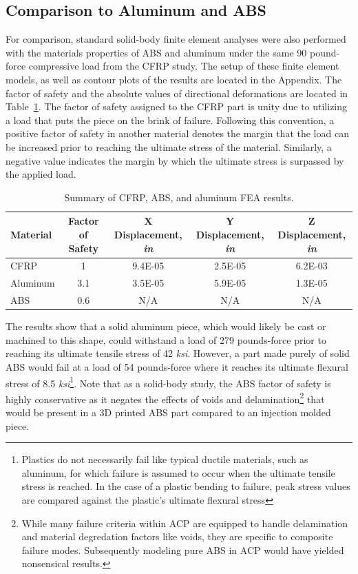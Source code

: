 \clearpage

\subsection{Comparison to Aluminum and ABS}

\indent

For comparison, standard solid-body finite element analyses were also performed with the materials properties of ABS and aluminum under the same 90 pound-force compressive load from the CFRP study. The setup of these finite element models, as well as contour plots of the results are located in the Appendix. The factor of safety and the absolute values of directional deformations are located in Table~\ref{tab:fea-cfrp-al-abs}. The factor of safety assigned to the CFRP part is unity due to utilizing a load that puts the piece on the brink of failure. Following this convention, a positive factor of safety in another material denotes the margin that the load can be increased prior to reaching the ultimate stress of the material. Similarly, a negative value indicates the margin by which the ultimate stress is surpassed by the applied load.

\begin{table}[htp]
    \centering
    \begin{tabular}{lcccc}
    
        Material & Factor of Safety & X Displacement, \emph{in} & Y Displacement, \emph{in} & Z Displacement, \emph{in} \\ \hline
        CFRP & 1 & 9.4E-05 & 2.5E-05 & 6.2E-03 \\
        Aluminum & 3.1 & 3.5E-05 & 5.9E-05 & 1.3E-05 \\
        ABS & 0.6 & N/A & N/A & N/A \\
                
    \end{tabular}
    \caption{Summary of CFRP, ABS, and aluminum FEA results.}
    \label{tab:fea-cfrp-al-abs}
\end{table}

The results show that a solid aluminum piece, which would likely be cast or machined to this shape, could withstand a load of 279 pounds-force prior to reaching its ultimate tensile stress of 42 \emph{ksi}. However, a part made purely of solid ABS would fail at a load of 54 pounds-force where it reaches its ultimate flexural stress of 8.5 \emph{ksi}\footnote{Plastics do not necessarily fail like typical ductile materials, such as aluminum, for which failure is assumed to occur when the ultimate tensile stress is reached. In the case of a plastic bending to failure, peak stress values are compared against the plastic's ultimate flexural stress}. Note that as a solid-body study, the ABS factor of safety is highly conservative as it negates the effects of voids and delamination\footnote{While many failure criteria within ACP are equipped to handle delamination and material degredation factors like voids, they are specific to composite failure modes. Subsequently modeling pure ABS in ACP would have yielded nonsensical results.} that would be present in a 3D printed ABS part compared to an injection molded piece.\\

